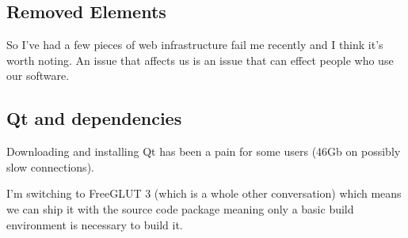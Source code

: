\documentclass[a4paper]{report}
\begin{document}
\subsection{Removed Elements}

So I've had a few pieces of web infrastructure fail me recently and I think
it's worth noting. An issue that affects us is an issue that can effect people
who use our software.

\subsection{Qt and dependencies}

Downloading and installing Qt has been a pain for some users (46Gb on possibly
slow connections).

I'm switching to FreeGLUT 3 (which is a whole other conversation) which means
we can ship it with the source code package meaning only a basic build
environment is necessary to build it.
\end{document}

